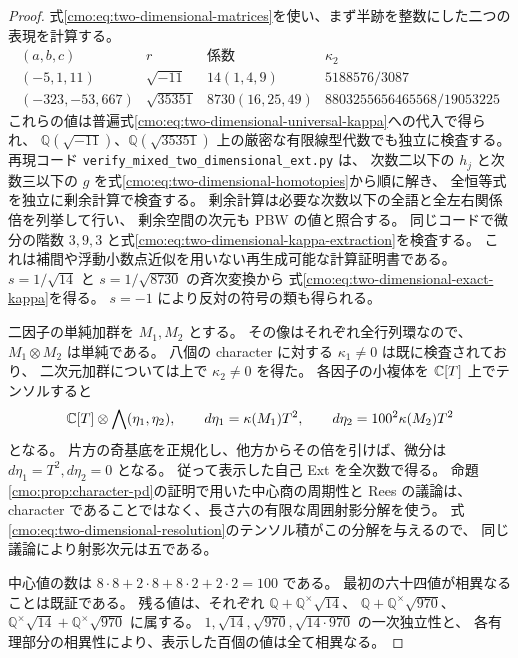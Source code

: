 \begin{proof}
式\eqref{cmo:eq:two-dimensional-matrices}を使い、まず半跡を整数にした二つの表現を計算する。
\[
 \begin{array}{c|c|c|c}
 (a,b,c)&r&\text{係数}&\kappa_2\\\hline
 (-5,1,11)&\sqrt{-11}&14(1,4,9)&5188576/3087\\
 (-323,-53,667)&\sqrt{35351}&8730(16,25,49)&
 8803255656465568/19053225
 \end{array}
\]
これらの値は普遍式\eqref{cmo:eq:two-dimensional-universal-kappa}への代入で得られ、
$\mathbb Q(\sqrt{-11})$、$\mathbb Q(\sqrt{35351})$ 上の厳密な有限線型代数でも独立に検査する。
再現コード \texttt{verify\_mixed\_two\_dimensional\_ext.py} は、
次数二以下の $h_j$ と次数三以下の $g$ を式\eqref{cmo:eq:two-dimensional-homotopies}から順に解き、
全恒等式を独立に剰余計算で検査する。
剰余計算は必要な次数以下の全語と全左右関係倍を列挙して行い、
剰余空間の次元も PBW の値と照合する。
同じコードで微分の階数 $3,9,3$ と式\eqref{cmo:eq:two-dimensional-kappa-extraction}を検査する。
これは補間や浮動小数点近似を用いない再生成可能な計算証明書である。
$s=1/\sqrt{14}$ と $s=1/\sqrt{8730}$ の斉次変換から
式\eqref{cmo:eq:two-dimensional-exact-kappa}を得る。
$s=-1$ により反対の符号の類も得られる。

二因子の単純加群を $M_1,M_2$ とする。
その像はそれぞれ全行列環なので、$M_1\otimes M_2$ は単純である。
八個の character に対する $\kappa_1\ne0$ は既に検査されており、
二次元加群については上で $\kappa_2\ne0$ を得た。
各因子の小複体を $\mathbb C[T]$ 上でテンソルすると
\[
 \mathbb C[T]\otimes\bigwedge(\eta_1,\eta_2),\qquad
 d\eta_1=\kappa(M_1)T^2,\qquad
 d\eta_2=100^2\kappa(M_2)T^2
\]
となる。
片方の奇基底を正規化し、他方からその倍を引けば、微分は
$d\eta_1=T^2,d\eta_2=0$ となる。
従って表示した自己 Ext を全次数で得る。
命題\ref{cmo:prop:character-pd}の証明で用いた中心商の周期性と Rees の議論は、
character であることではなく、長さ六の有限な周囲射影分解を使う。
式\eqref{cmo:eq:two-dimensional-resolution}のテンソル積がこの分解を与えるので、
同じ議論により射影次元は五である。

中心値の数は $8\cdot8+2\cdot8+8\cdot2+2\cdot2=100$ である。
最初の六十四値が相異なることは既証である。
残る値は、それぞれ $\mathbb Q+\mathbb Q^\times\sqrt{14}$、
$\mathbb Q+\mathbb Q^\times\sqrt{970}$、
$\mathbb Q^\times\sqrt{14}+\mathbb Q^\times\sqrt{970}$ に属する。
$1,\sqrt{14},\sqrt{970},\sqrt{14\cdot970}$ の一次独立性と、
各有理部分の相異性により、表示した百個の値は全て相異なる。
\end{proof}

